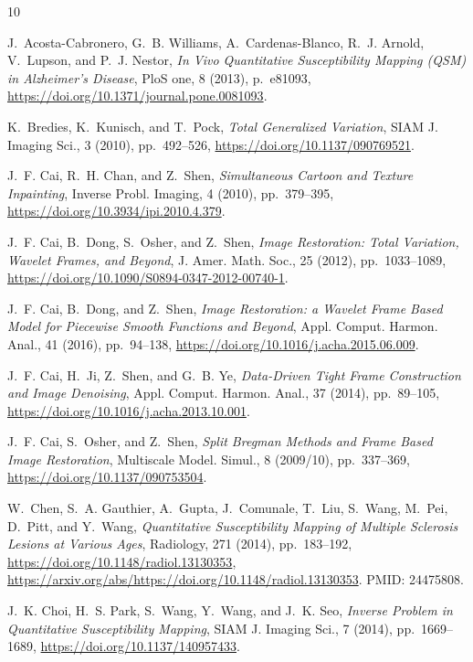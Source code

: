 \documentclass[reqno]{siamonline1116}
\numberwithin{theorem}{section}
\numberwithin{equation}{section}
\begin{document}

\begin{thebibliography}{10}

{\sc J.~Acosta-Cabronero, G.~B. Williams, A.~Cardenas-Blanco, R.~J. Arnold,
  V.~Lupson, and P.~J. Nestor}, {\em {In Vivo Quantitative Susceptibility
  Mapping (QSM) in Alzheimer's Disease}}, PloS one, 8 (2013), p.~e81093,
  \url{https://doi.org/10.1371/journal.pone.0081093}.

{\sc K.~Bredies, K.~Kunisch, and T.~Pock}, {\em {Total Generalized Variation}},
  SIAM J. Imaging Sci., 3 (2010), pp.~492--526,
  \url{https://doi.org/10.1137/090769521}.

{\sc J.~F. Cai, R.~H. Chan, and Z.~Shen}, {\em {Simultaneous Cartoon and
  Texture Inpainting}}, Inverse Probl. Imaging, 4 (2010), pp.~379--395,
  \url{https://doi.org/10.3934/ipi.2010.4.379}.

{\sc J.~F. Cai, B.~Dong, S.~Osher, and Z.~Shen}, {\em {Image Restoration: Total
  Variation, Wavelet Frames, and Beyond}}, J. Amer. Math. Soc., 25 (2012),
  pp.~1033--1089, \url{https://doi.org/10.1090/S0894-0347-2012-00740-1}.

{\sc J.~F. Cai, B.~Dong, and Z.~Shen}, {\em {Image Restoration: a Wavelet Frame
  Based Model for Piecewise Smooth Functions and Beyond}}, Appl. Comput.
  Harmon. Anal., 41 (2016), pp.~94--138,
  \url{https://doi.org/10.1016/j.acha.2015.06.009}.

{\sc J.~F. Cai, H.~Ji, Z.~Shen, and G.~B. Ye}, {\em {Data-Driven Tight Frame
  Construction and Image Denoising}}, Appl. Comput. Harmon. Anal., 37 (2014),
  pp.~89--105, \url{https://doi.org/10.1016/j.acha.2013.10.001}.

{\sc J.~F. Cai, S.~Osher, and Z.~Shen}, {\em {Split {B}regman Methods and Frame
  Based Image Restoration}}, Multiscale Model. Simul., 8 (2009/10),
  pp.~337--369, \url{https://doi.org/10.1137/090753504}.

{\sc W.~Chen, S.~A. Gauthier, A.~Gupta, J.~Comunale, T.~Liu, S.~Wang, M.~Pei,
  D.~Pitt, and Y.~Wang}, {\em {Quantitative Susceptibility Mapping of Multiple
  Sclerosis Lesions at Various Ages}}, Radiology, 271 (2014), pp.~183--192,
  \url{https://doi.org/10.1148/radiol.13130353},
  \url{https://arxiv.org/abs/https://doi.org/10.1148/radiol.13130353}.
\newblock PMID: 24475808.

{\sc J.~K. Choi, H.~S. Park, S.~Wang, Y.~Wang, and J.~K. Seo}, {\em {Inverse
  Problem in Quantitative Susceptibility Mapping}}, SIAM J. Imaging Sci., 7
  (2014), pp.~1669--1689, \url{https://doi.org/10.1137/140957433}.


\end{thebibliography}
\end{document}

